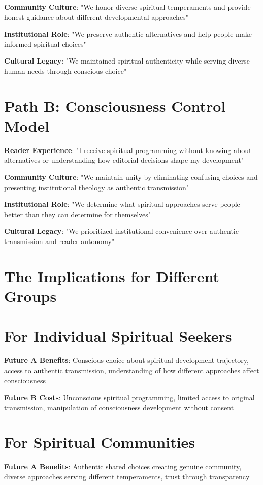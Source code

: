 \documentclass[11pt,twoside]{book}
\begin{document}
\textbf{\textbf{Community Culture}}: "We honor diverse spiritual temperaments and provide honest guidance about different developmental approaches"

\textbf{\textbf{Institutional Role}}: "We preserve authentic alternatives and help people make informed spiritual choices"

\textbf{\textbf{Cultural Legacy}}: "We maintained spiritual authenticity while serving diverse human needs through conscious choice"
\section*{Path B: Consciousness Control Model}
\label{sec:org126c561}
\textbf{\textbf{Reader Experience}}: "I receive spiritual programming without knowing about alternatives or understanding how editorial decisions shape my development"

\textbf{\textbf{Community Culture}}: "We maintain unity by eliminating confusing choices and presenting institutional theology as authentic transmission"

\textbf{\textbf{Institutional Role}}: "We determine what spiritual approaches serve people better than they can determine for themselves"

\textbf{\textbf{Cultural Legacy}}: "We prioritized institutional convenience over authentic transmission and reader autonomy"
\section*{The Implications for Different Groups}
\label{sec:org4fc76b9}

\section*{For Individual Spiritual Seekers}
\label{sec:org808edba}
\textbf{\textbf{Future A Benefits}}: Conscious choice about spiritual development trajectory, access to authentic transmission, understanding of how different approaches affect consciousness

\textbf{\textbf{Future B Costs}}: Unconscious spiritual programming, limited access to original transmission, manipulation of consciousness development without consent
\section*{For Spiritual Communities}
\label{sec:org111100a}
\textbf{\textbf{Future A Benefits}}: Authentic shared choices creating genuine community, diverse approaches serving different temperaments, trust through transparency
\end{document}
